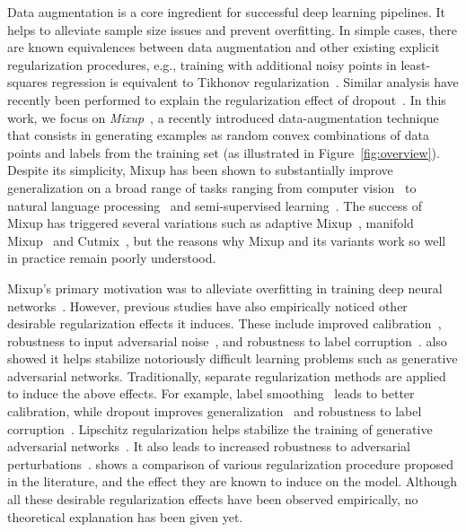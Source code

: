 \documentclass[twoside,11pt]{article}
\newcommand{\rev}[1]{{#1}}
\begin{document}
Data augmentation is a core ingredient for successful deep learning pipelines. 
It helps to alleviate sample size issues and prevent overfitting. 
In simple cases, there are known equivalences between data augmentation and other existing explicit 
regularization procedures, e.g., training with additional noisy points in least-squares regression 
is equivalent to Tikhonov regularization~\citep{bishop1995training}. 
Similar analysis have recently been performed to explain the regularization effect of 
dropout~\citep{srivastava2014dropout,wager2013dropout,wei2020implicit}.
In this work, we focus on \textit{Mixup}~\rev{\citep{Zhang2018mixup,tokozume2018between}}, a recently introduced data-augmentation 
technique that consists in generating examples as random convex combinations of data points and labels 
from the training set (as illustrated in Figure~\ref{fig:overview}). 
Despite its simplicity, Mixup has been shown to substantially improve generalization on a broad 
range of tasks ranging from computer vision~\rev{\citep{Zhang2018mixup,tokozume2018between}} to natural language 
processing~\citep{guo2020nonlinear} and semi-supervised learning~\citep{berthelot2019mixmatch}. 
The success of Mixup has triggered several variations such as adaptive Mixup~\citep{guo2019mixup}, 
manifold Mixup~\citep{verma2018manifold} and Cutmix~\citep{yun2019cutmix}, but the reasons why Mixup and 
its variants work so well in practice remain poorly understood.

Mixup's primary motivation was to alleviate overfitting in training deep neural networks~\citep{Zhang2018mixup}. 
However, previous studies have also empirically noticed other desirable regularization effects it induces. 
These include improved calibration~\citep{thulasidasan2019mixup}, robustness to input adversarial noise~\citep{Zhang2018mixup}, 
and robustness to label corruption~\citep{Zhang2018mixup}. \citet{Zhang2018mixup} also 
showed it helps stabilize notoriously difficult learning problems such as generative adversarial networks. 
Traditionally, separate regularization methods are applied to induce the above effects. 
For example, label smoothing~\citep{szegedy2016rethinking,Muller2019When} leads to better calibration, 
while dropout improves generalization~\citep{srivastava2014dropout,wager2013dropout} and robustness to 
label corruption~\citep{arpit2017closer}.  Lipschitz regularization helps stabilize the training of generative 
adversarial networks~\citep{arjovsky2017wasserstein,gulrajani2017improved}. It also leads to increased robustness to 
adversarial perturbations~\citep{hein2017formal,cisse2017parseval}. 
 shows a comparison of various regularization procedure proposed in the literature, 
and the effect they are known to induce on the model. 
Although all these desirable regularization effects have been observed empirically, 
no theoretical explanation has been given yet.
\end{document}
